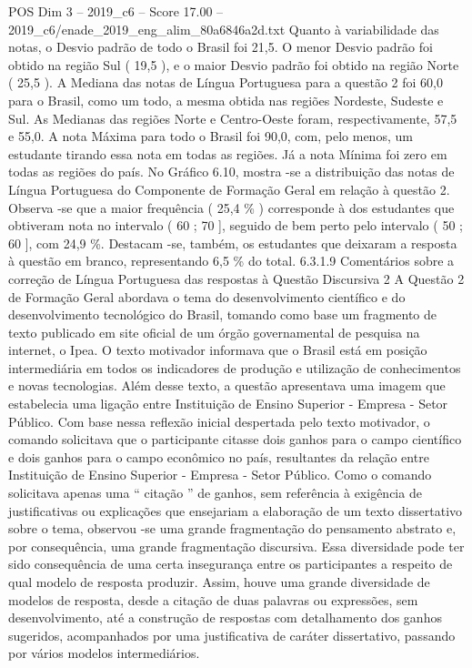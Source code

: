 \begin{textsample}{POS Dim 3 – 2019\_c6 – Score 17.00 – 2019\_c6/enade\_2019\_eng\_alim\_80a6846a2d.txt}
Quanto à variabilidade das notas, o Desvio padrão de todo o Brasil foi 21,5.
O menor Desvio padrão foi obtido na região Sul ( 19,5 ), e o maior Desvio padrão foi obtido na região Norte ( 25,5 ).
A Mediana das notas de Língua Portuguesa para a questão 2 foi 60,0 para o Brasil, como um todo, a mesma obtida nas regiões Nordeste, Sudeste e Sul.
As Medianas das regiões Norte e Centro-Oeste foram, respectivamente, 57,5 e 55,0.
A nota Máxima para todo o Brasil foi 90,0, com, pelo menos, um estudante tirando essa nota em todas as regiões.
Já a nota Mínima foi zero em todas as regiões do país.
No Gráfico 6.10, mostra -se a distribuição das notas de Língua Portuguesa do Componente de Formação Geral em relação à questão 2.
Observa -se que a maior frequência ( 25,4 \% ) corresponde à dos estudantes que obtiveram nota no intervalo ( 60 ; 70 ], seguido de bem perto pelo intervalo ( 50 ; 60 ], com 24,9 \%.
Destacam -se, também, os estudantes que deixaram a resposta à questão em branco, representando 6,5 \% do total. 6.3.1.9 Comentários sobre a correção de Língua Portuguesa das respostas à Questão Discursiva 2 A Questão 2 de Formação Geral abordava o tema do desenvolvimento científico e do desenvolvimento tecnológico do Brasil, tomando como base um fragmento de texto publicado em site oficial de um órgão governamental de pesquisa na internet, o Ipea.
O texto motivador informava que o Brasil está em posição intermediária em todos os indicadores de produção e utilização de conhecimentos e novas tecnologias.
Além desse texto, a questão apresentava uma imagem que estabelecia uma ligação entre Instituição de Ensino Superior - Empresa - Setor Público.
Com base nessa reflexão inicial despertada pelo texto motivador, o comando solicitava que o participante citasse dois ganhos para o campo científico e dois ganhos para o campo econômico no país, resultantes da relação entre Instituição de Ensino Superior - Empresa - Setor Público.
Como o comando solicitava apenas uma “ citação ” de ganhos, sem referência à exigência de justificativas ou explicações que ensejariam a elaboração de um texto dissertativo sobre o tema, observou -se uma grande fragmentação do pensamento abstrato e, por consequência, uma grande fragmentação discursiva.
Essa diversidade pode ter sido consequência de uma certa insegurança entre os participantes a respeito de qual modelo de resposta produzir.
Assim, houve uma grande diversidade de modelos de resposta, desde a citação de duas palavras ou expressões, sem desenvolvimento, até a construção de respostas com detalhamento dos ganhos sugeridos, acompanhados por uma justificativa de caráter dissertativo, passando por vários modelos intermediários.

\end{textsample}
